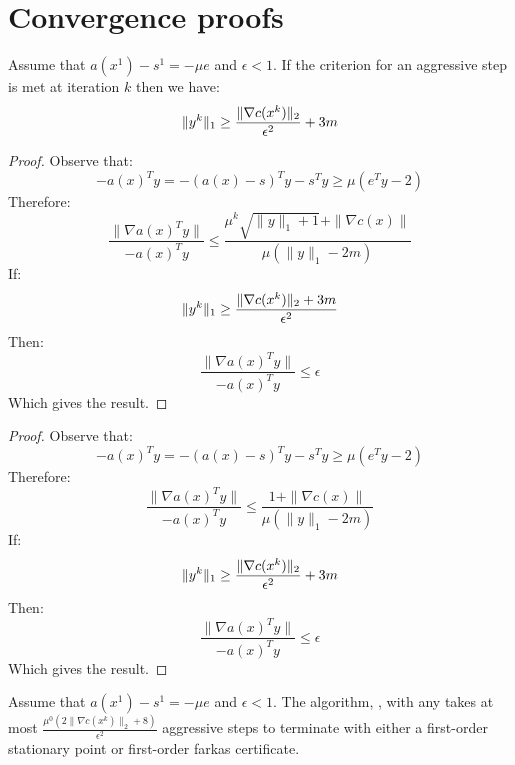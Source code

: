 \documentclass{article}
\begin{document}
\section{Convergence proofs}

\begin{lemma}
Assume that $a(x^{1}) - s^{1} = -\mu e$ and $\epsilon < 1$.
If the criterion for an aggressive step is met at iteration $k$ then we have:
$$
\| y^k \|_{1} \ge \frac{\| \nabla c(x^{k}) \|_{2}}{\epsilon^2} + 3 m
$$
\end{lemma}

\begin{proof}
Observe that:
$$-a(x)^T y = -(a(x) - s)^T y - s^T y \ge  \mu (e^T y - 2)$$
Therefore:
$$
\frac{\| \nabla a(x)^T y \|}{-a(x)^T y} \le \frac{\mu^k \sqrt{ \| y \|_{1} + 1} + \| \nabla c(x) \|}{\mu ( \| y \|_{1} - 2 m )} 
$$
If:
$$
\| y^k \|_{1} \ge \frac{\| \nabla c(x^{k}) \|_{2} +  3 m}{\epsilon^2} 
$$
Then:
$$
\frac{\| \nabla a(x)^T y \|}{-a(x)^T y} \le \epsilon 
$$
Which gives the result.
\end{proof}

\begin{proof}
Observe that:
$$-a(x)^T y = -(a(x) - s)^T y - s^T y \ge  \mu (e^T y - 2)$$
Therefore:
$$
\frac{\| \nabla a(x)^T y \|}{-a(x)^T y} \le \frac{1+ \| \nabla c(x) \|}{\mu ( \| y \|_{1} - 2 m )} 
$$
If:
$$
\| y^k \|_{1} \ge \frac{\| \nabla c(x^{k}) \|_{2}}{\epsilon^2} +  3 m
$$
Then:
$$
\frac{\| \nabla a(x)^T y \|}{-a(x)^T y} \le \epsilon 
$$
Which gives the result.
\end{proof}


\begin{lemma}
Assume that $a(x^{1}) - s^{1} = -\mu e$ and $\epsilon < 1$.
The algorithm, \callSimpleIPM{}, with any takes at most $\frac{\mu^{0} (2 \| \nabla c(x^{k}) \|_{2} + 8)}{\epsilon^2}$ aggressive steps to terminate with either a first-order stationary point or first-order farkas certificate.
\end{lemma}
\end{document}
